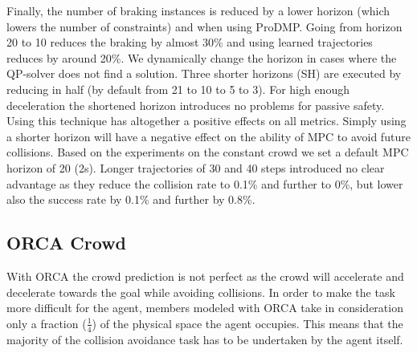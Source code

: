 \documentclass[letterpaper,conference,10pt]{IEEEconf}
\begin{document}
Finally, the number of braking instances is reduced by a lower horizon (which lowers the number of constraints) and when using ProDMP. Going from horizon 20 to 10 reduces the braking by almost 30\% and using learned trajectories reduces by around 20\%. We dynamically change the horizon in cases where the QP-solver does not find a solution. Three shorter horizons (SH) are executed by reducing in half (by default from 21 to 10 to 5 to 3). For high enough deceleration the shortened horizon introduces no problems for passive safety. Using this technique has altogether a positive effects on all metrics. Simply using a shorter horizon will have a negative effect on the ability of MPC to avoid future collisions. Based on the experiments on the constant crowd we set a default MPC horizon of 20 (2s). Longer trajectories of 30 and 40 steps introduced no clear advantage as they reduce the collision rate to 0.1\% and further to 0\%, but lower also the success rate by 0.1\% and further by 0.8\%.

\subsection{ORCA Crowd}

With ORCA \cite{berg_optimal_2011} the crowd prediction is not perfect as the crowd will accelerate and decelerate towards the goal while avoiding collisions. In order to make the task more difficult for the agent, members modeled with ORCA take in consideration only a fraction ($\frac{1}{4}$) of the physical space the agent occupies. This means that the majority of the collision avoidance task has to be undertaken by the agent itself.
\end{document}

